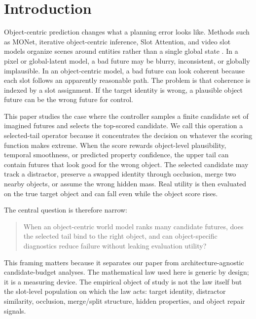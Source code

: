 \documentclass[10pt]{article}
\begin{document}
\section{Introduction}

Object-centric prediction changes what a planning error looks like. Methods such as MONet, iterative object-centric inference, Slot Attention, and video slot models organize scenes around entities rather than a single global state \cite{burgess2019monet,greff2019multi,locatello2020slot,kipf2021conditional}. In a pixel or global-latent model, a bad future may be blurry, inconsistent, or globally implausible. In an object-centric model, a bad future can look coherent because each slot follows an apparently reasonable path. The problem is that coherence is indexed by a slot assignment. If the target identity is wrong, a plausible object future can be the wrong future for control.

This paper studies the case where the controller samples a finite candidate set of imagined futures and selects the top-scored candidate. We call this operation a selected-tail operator because it concentrates the decision on whatever the scoring function makes extreme. When the score rewards object-level plausibility, temporal smoothness, or predicted property confidence, the upper tail can contain futures that look good for the wrong object. The selected candidate may track a distractor, preserve a swapped identity through occlusion, merge two nearby objects, or assume the wrong hidden mass. Real utility is then evaluated on the true target object and can fall even while the object score rises.

The central question is therefore narrow:

\begin{quote}
When an object-centric world model ranks many candidate futures, does the selected tail bind to the right object, and can object-specific diagnostics reduce failure without leaking evaluation utility?
\end{quote}

This framing matters because it separates our paper from architecture-agnostic candidate-budget analyses. The mathematical law used here is generic by design; it is a measuring device. The empirical object of study is not the law itself but the slot-level population on which the law acts: target identity, distractor similarity, occlusion, merge/split structure, hidden properties, and object repair signals.
\end{document}
